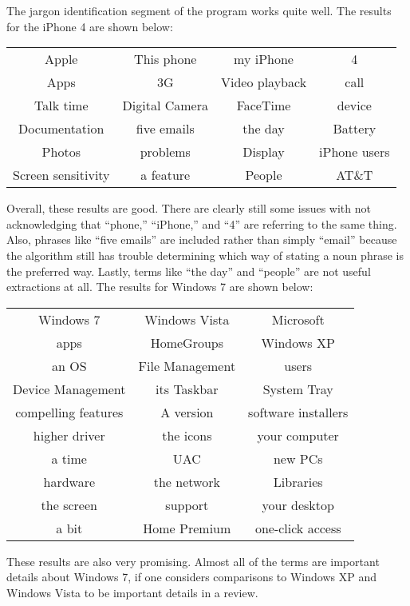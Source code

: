 \documentclass{article}
\begin{document}
The jargon identification segment of the program works quite well.  The results for the iPhone 4 are shown below:\\\begin{center}\begin{tabular}{cccc}
	Apple&This phone&my iPhone&4\\
	Apps&3G&Video playback&call\\
	Talk time&Digital Camera&FaceTime&device\\
	Documentation&five emails&the day&Battery\\
	Photos&problems&Display&iPhone users\\
	Screen sensitivity&a feature&People&AT\&T
\end{tabular}
\end{center}
Overall, these results are good.  There are clearly still some issues with not acknowledging that ``phone,'' ``iPhone,'' and ``4'' are referring to the same thing.  Also, phrases like ``five emails'' are included rather than simply ``email'' because the algorithm still has trouble determining which way of stating a noun phrase is the preferred way.  Lastly, terms like ``the day'' and ``people'' are not useful extractions at all.
The results for Windows 7 are shown below:\\\begin{center}\begin{tabular}{ccc}
	Windows 7&Windows Vista&Microsoft\\
	apps&HomeGroups&Windows XP\\
	an OS&File Management&users\\
	Device Management&its Taskbar&System Tray\\
	compelling features&A version&software installers\\
	higher driver&the icons&your computer\\
	a time&UAC&new PCs\\
	hardware&the network&Libraries\\
	the screen&support&your desktop\\
	a bit&Home Premium&one-click access
\end{tabular}
\end{center}
These results are also very promising.  Almost all of the terms are important details about Windows 7, if one considers comparisons to Windows XP and Windows Vista to be important details in a review.

\end{document}
